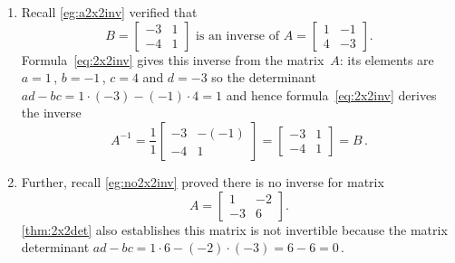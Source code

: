 \begin{example} \label{eg:}
\begin{enumerate}
\item Recall \autoref{eg:a2x2inv} verified that
\begin{equation*}
B=\begin{bmatrix} -3&1\\-4&1 \end{bmatrix}
\text{ is an inverse of }
A=\begin{bmatrix} 1&-1\\4&-3 \end{bmatrix}.
\end{equation*}
Formula~\eqref{eq:2x2inv} gives this inverse from the matrix~\(A\): its elements are \(a=1\)\,, \(b=-1\)\,, \(c=4\) and \(d=-3\) so the determinant \(ad-bc=1\cdot(-3)-(-1)\cdot4=1\) and hence formula~\eqref{eq:2x2inv} derives the inverse
\begin{equation*}
A^{-1}=\frac11\begin{bmatrix} -3&-(-1)\\-4&1 \end{bmatrix}
=\begin{bmatrix} -3&1\\-4&1 \end{bmatrix}=B\,.
\end{equation*}

\item Further, recall \autoref{eg:no2x2inv} proved there is no inverse for matrix
\begin{equation*}
A=\begin{bmatrix} 1&-2\\-3&6 \end{bmatrix}.
\end{equation*}
\autoref{thm:2x2det} also establishes this matrix is not invertible because the matrix determinant \(ad-bc=1\cdot6-(-2)\cdot(-3)=6-6=0\)\,. 
\end{enumerate}
\end{example}




